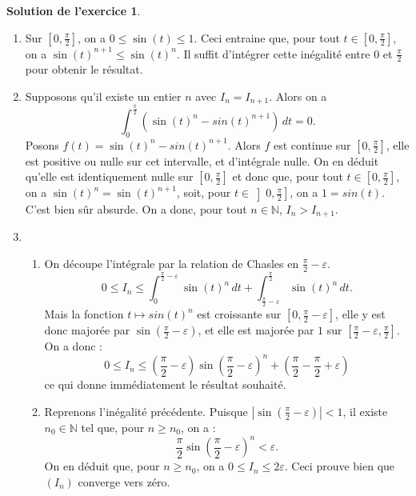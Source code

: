 \documentclass[a4paper, 11pt,openany]{article}%
\theoremstyle{plain}
\theoremstyle{definition}
\newtheorem{sol}{Solution de l'exercice}
\theoremstyle{remark}
\newcommand{\N}{\mathbb{N}}
\begin{document}
\begin{sol}
\begin{enumerate}
\item Sur $\left[ 0 ,\frac{\pi}{2} \right]$, on a $0 \leqslant \sin(t)  \leqslant 1$. Ceci entraine que, pour tout $t \in \left[ 0 ,\frac{\pi}{2} \right]$, on a $\sin(t)^{n+1} \leqslant \sin(t)^n$. Il suffit d'intégrer cette inégalité entre $0$ et $\frac{\pi}{2}$ pour obtenir le résultat.
\item Supposons qu'il existe un entier $n$
avec $I_n=I_{n+1}$. Alors on a 
\[ \int_0^{\frac{\pi}{2}} (\sin(t)^n  - sin(t)^{n+1}) \,dt=0.\]
Posons $f(t)=\sin(t)^n  - sin(t)^{n+1}$. Alors $f$ est continue sur $\left[ 0 ,\frac{\pi}{2} \right]$, elle est positive ou nulle sur cet intervalle, et d'intégrale nulle. On en déduit qu'elle est identiquement nulle sur $\left[ 0 ,\frac{\pi}{2} \right]$ et donc que, pour tout $t \in \left[ 0 ,\frac{\pi}{2} \right]$, on a $\sin(t)^n =\sin(t)^{n+1}$, soit, pour $t \in \left] 0 ,\frac{\pi}{2} \right]$, on a $1=sin(t)$. C'est bien sûr absurde. On a donc, pour tout $n \in \N$, $I_n > I_{n+1}$.
\item \begin{enumerate}
\item On découpe l'intégrale par la relation de Chasles en $\frac{\pi}{2} - \varepsilon$. 
\[ 0 \leqslant I_n \leqslant \int_0^{\frac{\pi}{2} - \varepsilon}\sin(t)^n \, dt + \int_{\frac{\pi}{2} - \varepsilon}^{\frac{\pi}{2}}\sin(t)^n \, dt.\]
Mais la fonction $t \mapsto sin(t)^n$ est croissante sur $\left[ 0 ,\frac{\pi}{2} - \varepsilon \right]$, elle y est donc majorée par $\sin \left(\frac{\pi}{2} - \varepsilon \right)$, et elle est majorée par $1$ sur $\left[ \frac{\pi}{2} - \varepsilon , \frac{\pi}{2} \right]$. On a donc :
\[ 0 \leqslant I_n \leqslant \left( \frac{\pi}{2} - \varepsilon \right) \sin \left( \frac{\pi}{2} - \varepsilon \right)^n + \left( \frac{\pi}{2} - \frac{\pi}{2} + \varepsilon \right)\]
ce qui donne immédiatement le résultat souhaité.
\item Reprenons l'inégalité précédente. Puisque $|\sin \left( \frac{\pi}{2} - \varepsilon \right)|<1$, il existe $n_0 \in\N$ tel que, pour $n \geqslant n_0$, on a : 
\[ \frac{\pi}{2} \sin \left( \frac{\pi}{2} - \varepsilon \right)^n < \varepsilon.\]
On en déduit que, pour $n \geqslant n_0$, on a $ 0 \leqslant I_n \leqslant 2 \varepsilon$. Ceci prouve bien que $(I_n)$ converge vers zéro.
\end{enumerate}
\end{enumerate}
\end{sol}
\end{document}
